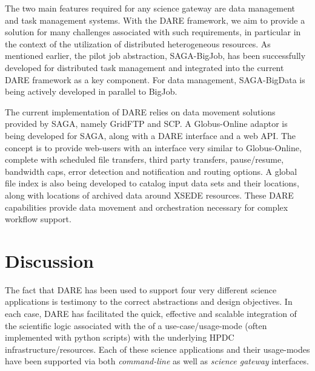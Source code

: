 \documentclass[]{svjour3}
\begin{document}
The two main features required for any science gateway are data
management and task management systems.  With the DARE framework, we
aim to provide a solution for many challenges associated with such
requirements, in particular in the context of the utilization of
distributed heterogeneous resources.  As mentioned earlier, the pilot
job abstraction, SAGA-BigJob, has been successfully developed for
distributed task management and integrated into the current DARE
framework as a key component.  For data management, SAGA-BigData is
being actively developed in parallel to BigJob.

The current implementation of DARE relies on data movement solutions
provided by SAGA, namely GridFTP and SCP. A Globus-Online adaptor is
being developed for SAGA, along with a DARE interface and a web
API. The concept is to provide web-users with an interface very
similar to Globus-Online, complete with scheduled file transfers,
third party transfers, pause/resume, bandwidth caps, error detection
and notification and routing options. A global file index is also
being developed to catalog input data sets and their locations, along
with locations of archived data around XSEDE resources. These DARE
capabilities provide data movement and orchestration necessary for
complex workflow support.

\section{Discussion}


The fact that DARE has been used to support four very different
science applications is testimony to the correct abstractions and
design objectives.  In each case, DARE has facilitated the quick,
effective and scalable integration of the scientific logic associated
with the of a use-case/usage-mode (often implemented with python
scripts) with the underlying HPDC infrastructure/resources.  Each of
these science applications and their usage-modes have been supported
via both {\it command-line} as well as {\it science gateway}
interfaces.

\end{document}
